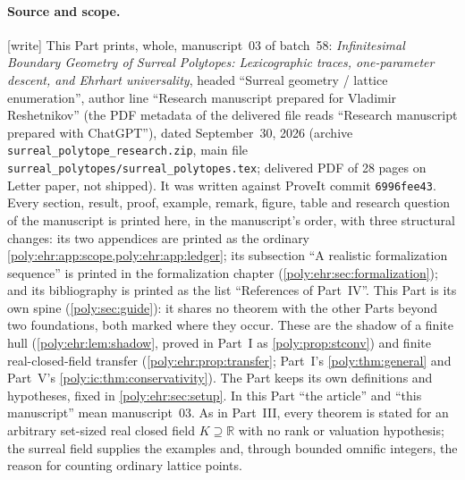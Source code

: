 \documentclass[11pt,a4paper]{article}
\numberwithin{equation}{section}
\theoremstyle{plain}
\newcommand{\wtag}{\textup{[write]}}%
\newcommand{\R}{\mathbb R}
\newcommand{\pathcode}[1]{\nolinkurl{#1}}
\begin{document}
\paragraph{Source and scope.}\wtag{} This Part prints, whole, manuscript~03 of
batch~58: \emph{Infinitesimal Boundary Geometry of Surreal Polytopes:
Lexicographic traces, one-parameter descent, and Ehrhart universality}, headed
``Surreal geometry / lattice enumeration'', author line ``Research manuscript
prepared for Vladimir Reshetnikov'' (the PDF metadata of the delivered file
reads ``Research manuscript prepared with ChatGPT''), dated September~30, 2026
(archive \pathcode{surreal_polytope_research.zip}, main file
\pathcode{surreal_polytopes/surreal_polytopes.tex}; delivered PDF of 28 pages
on Letter paper, not shipped). It was written against ProveIt commit
\pathcode{6996fee43}. Every section, result, proof, example, remark, figure,
table and research question of the manuscript is printed here, in the
manuscript's order, with three structural changes: its two appendices are
printed as the ordinary \cref{poly:ehr:app:scope,poly:ehr:app:ledger}; its
subsection ``A realistic formalization sequence'' is printed in the
formalization chapter (\cref{poly:ehr:sec:formalization}); and its
bibliography is printed as the list ``References of Part~IV''. This Part is
its own spine (\cref{poly:sec:guide}): it shares no theorem with the other
Parts beyond two foundations, both marked where they occur. These are the
shadow of a finite hull (\cref{poly:ehr:lem:shadow}, proved in Part~I as
\cref{poly:prop:stconv}) and finite real-closed-field transfer
(\cref{poly:ehr:prop:transfer}; Part~I's \cref{poly:thm:general} and Part~V's
\cref{poly:ic:thm:conservativity}). The Part keeps its own definitions and
hypotheses, fixed in \cref{poly:ehr:sec:setup}. In this Part ``the article''
and ``this manuscript'' mean manuscript~03. As in Part~III, every
theorem is stated for an arbitrary set-sized real closed field $K\supseteq\R$
with no rank or valuation hypothesis; the surreal field supplies the
examples and, through bounded omnific integers, the reason for counting
ordinary lattice points.
\end{document}
